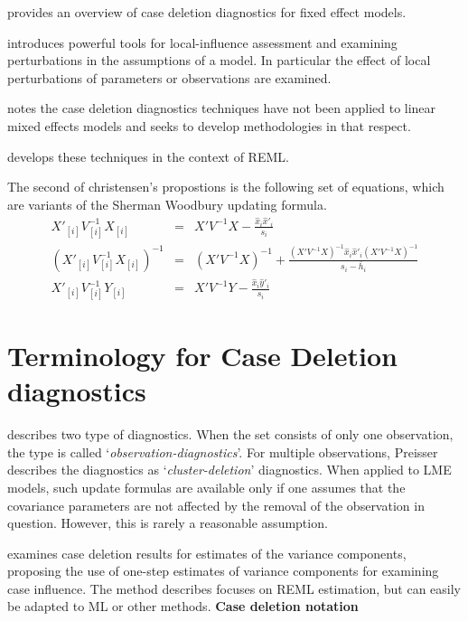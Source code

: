 \documentclass[12pt, a4paper]{report}
\theoremstyle{plain}
\theoremstyle{definition}
\theoremstyle{remark}
\begin{document}
\citet{Christensen} provides an overview of case deletion
diagnostics for fixed effect models.

\citet{cook86} introduces powerful tools for local-influence
assessment and examining perturbations in the assumptions of a
model. In particular the effect of local perturbations of
parameters or observations are examined.

\citet{Christensen} notes the case deletion diagnostics
techniques have not been applied to linear mixed effects models
and seeks to develop methodologies in that respect.

\citet{Christensen} develops these techniques in the context of REML.


The second of christensen's propostions is the following set of
equations, which are variants of the Sherman Woodbury updating
formula.
\begin{eqnarray}
X'_{[i]}V_{[i]}^{-1}X_{[i]} &=& X' V^{-1}X -
\frac{\hat{x}_{i}\hat{x}'_{i}}{s_{i}}\\
(X'_{[i]}V_{[i]}^{-1}X_{[i]})^{-1} &=& (X' V^{-1}X)^{-1} +
\frac{(X' V^{-1}X)^{-1}\hat{x}_{i}\hat{x}' _{i}
	(X' V^{-1}X)^{-1}}{s_{i}- \bar{h}_{i}}\\
X'_{[i]}V_{[i]}^{-1}Y_{[i]} &=& X\prime V^{-1}Y -
\frac{\hat{x}_{i}\hat{y}' _{i}}{s_{i}}
\end{eqnarray}


\section{Terminology for Case Deletion diagnostics} %

\citet{preisser} describes two type of diagnostics. When the set consists of only one observation, the type is called
`\textit{observation-diagnostics}'. For multiple observations, Preisser describes the diagnostics as `\textit{cluster-deletion}' diagnostics. When applied to LME models, such update formulas are available only if one assumes that the covariance parameters are not affected by the removal of the observation in question. However, this is rarely a reasonable assumption.

\citet{Christensen}examines case deletion results for estimates of
the variance components, proposing the use of one-step estimates
of variance components for examining case influence. The method
describes focuses on REML estimation, but can easily be adapted to
ML or other methods.
\noindent \textbf{Case deletion notation} %
\end{document}

